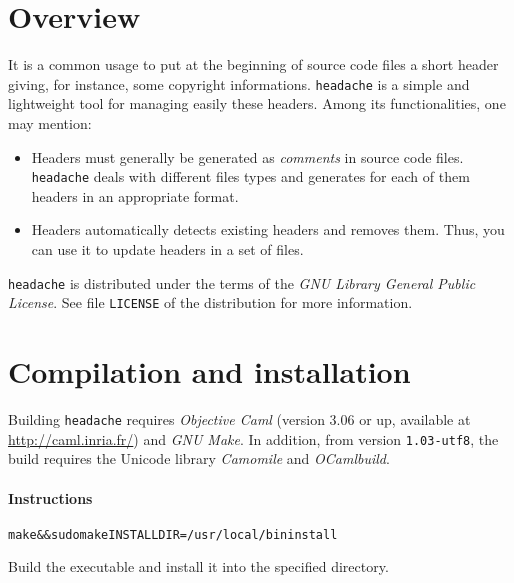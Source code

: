 \documentclass{article}
\title{\headache{}}
\author{Vincent Simonet}
\date{November, 2002}
\newcommand{\headache}{\texttt{headache}}
\begin{document}
\maketitle


\section{Overview}

It is a common usage to put at the beginning of source code files a
short header giving, for instance, some copyright informations.
\headache{} is a simple and lightweight tool for managing easily these
headers.  Among its functionalities, one may mention:
\begin{itemize}
\item Headers must generally be generated as \emph{comments} in source
  code files.  \headache{} deals with different files types and generates
  for each of them headers in an appropriate format.
\item Headers automatically detects existing headers and removes them.
  Thus, you can use it to update headers in a set of files.
\end{itemize}

\headache{} is distributed under the terms of the \emph{GNU Library General
  Public License}.  See file \verb+LICENSE+ of the distribution for
more information.


\section{Compilation and installation}

Building \headache{} requires \emph{Objective Caml} (version 3.06 or up,
available at \url{http://caml.inria.fr/}) and \emph{GNU Make}.
In addition, from version \texttt{1.03-utf8}, the build requires the Unicode library \emph{Camomile} and \emph{OCamlbuild}.

\paragraph{Instructions}

\begin{alltt}
  make && sudo make INSTALLDIR=/usr/local/bin install
\end{alltt}
Build the executable and install it into the specified directory.
\end{document}
